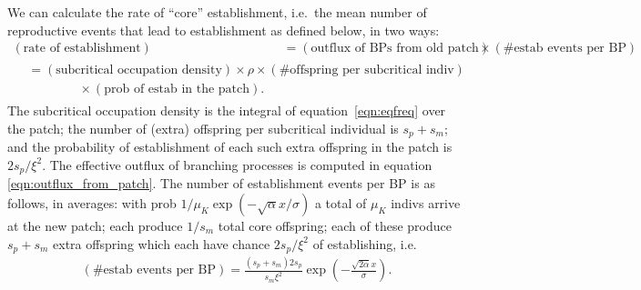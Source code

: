 \documentclass{article}
\begin{document}
We can calculate the rate of ``core'' establishment, i.e.\ the mean number of reproductive events that lead to establishment as defined below, in two ways:
\begin{align}
    (\mbox{rate of establishment}) &= (\mbox{outflux of BPs from old patch}) \times (\mbox{\# estab events per BP}) \label{eqn:heuristic1a} \\
    \begin{split} &= (\mbox{subcritical occupation density}) \times \rho \times (\mbox{\# offspring per subcritical indiv}) \label{eqn:heuristic1b} \\
    & \qquad \qquad \times (\mbox{prob of estab in the patch}) . \end{split} 
\end{align}
The subcritical occupation density is the integral of equation~\eqref{eqn:eqfreq} over the patch;
the number of (extra) offspring per subcritical individual is $s_p+s_m$;
and the probability of establishment of each such extra offspring in the patch is $2s_p/\xi^2$.
The effective outflux of branching processes is computed in equation \eqref{eqn:outflux_from_patch}.
The number of establishment events per BP is as follows, in averages: 
with prob $1/\mu_K \exp(-\sqrt{\alpha} x/ \sigma)$ a total of $\mu_K$ indivs arrive at the new patch; 
each produce $1/s_m$ total core offspring;
each of these produce $s_p+s_m$ extra offspring which each have chance $2s_p/\xi^2$ of establishing,
i.e.
\begin{align}
  (\mbox{\# estab events per BP}) = \frac{(s_p+s_m) 2 s_p }{ s_m \xi^2 } \exp\left(-\frac{\sqrt{2\alpha} x}{\sigma}\right) .
\end{align}
\end{document}

